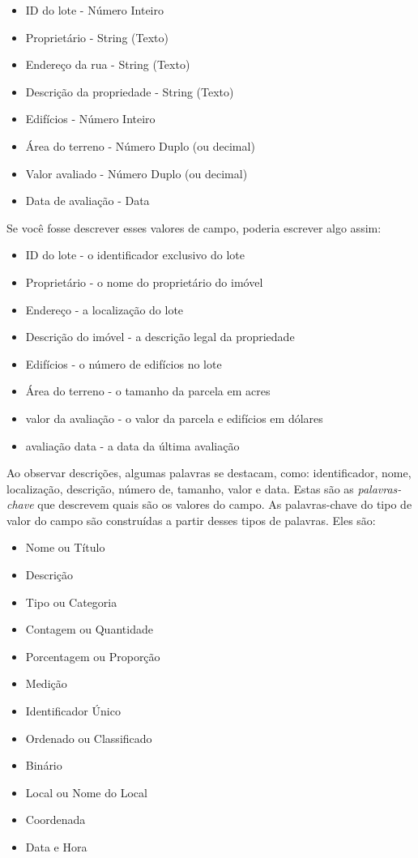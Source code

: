 \documentclass[
]{krantz}
\providecommand{\tightlist}{%
  \setlength{\itemsep}{0pt}\setlength{\parskip}{0pt}}
\begin{document}
\begin{itemize}
\tightlist
\item
  ID do lote - Número Inteiro
\item
  Proprietário - String (Texto)
\item
  Endereço da rua - String (Texto)
\item
  Descrição da propriedade - String (Texto)
\item
  Edifícios - Número Inteiro
\item
  Área do terreno - Número Duplo (ou decimal)
\item
  Valor avaliado - Número Duplo (ou decimal)
\item
  Data de avaliação - Data
\end{itemize}

Se você fosse descrever esses valores de campo, poderia escrever algo assim:

\begin{itemize}
\tightlist
\item
  ID do lote - o identificador exclusivo do lote
\item
  Proprietário - o nome do proprietário do imóvel
\item
  Endereço - a localização do lote
\item
  Descrição do imóvel - a descrição legal da propriedade
\item
  Edifícios - o número de edifícios no lote
\item
  Área do terreno - o tamanho da parcela em acres
\item
  valor da avaliação - o valor da parcela e edifícios em dólares
\item
  avaliação data - a data da última avaliação
\end{itemize}

Ao observar descrições, algumas palavras se destacam, como: identificador, nome, localização, descrição, número de, tamanho, valor e data. Estas são as \emph{palavras-chave} que descrevem quais são os valores do campo. As palavras-chave do tipo de valor do campo são construídas a partir desses tipos de palavras. Eles são:

\begin{itemize}
\tightlist
\item
  Nome ou Título
\item
  Descrição
\item
  Tipo ou Categoria
\item
  Contagem ou Quantidade
\item
  Porcentagem ou Proporção
\item
  Medição
\item
  Identificador Único
\item
  Ordenado ou Classificado
\item
  Binário
\item
  Local ou Nome do Local
\item
  Coordenada
\item
  Data e Hora
\end{itemize}
\end{document}

